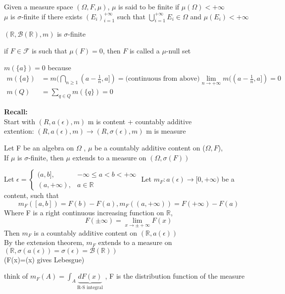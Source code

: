  \begin{definition}{}
 Given a measure space $ (\Omega,F,\mu) $,  $ \mu $ is said to be finite if $ \mu(\Omega)<+\infty $ \\
 $ \mu $ is $ \sigma $-finite if there exists $ {(E_i)}_{i=1}^{+\infty} $ such that $ \bigcup_{i=1}^{+\infty}E_i\in \Omega$ and $ \mu(E_i)<+\infty $
 \end{definition}
 \begin{example}[]{}
  $(\mathbb{R},\mathcal{B} (\mathbb{R}),m)$ is $ \sigma $-finite
 \end{example}
 \begin{definition}[]{}
 if $ F\in \mathcal{F} $ is such that $ \mu(F)=0 $, then $ F $ is called a $ \mu $-null set 
 \end{definition}
 \begin{example}[]{}
  $ m(\{a\})=0 $ because \begin{align*}{}{}
  m(\{a\})&=m(\bigcap_{n\geq1}(a-\frac{1}{n},a])=\text{(continuous from above)}\lim_{n\rightarrow+\infty}m((a-\frac{1}{n},a])=0\\
  m(Q)&=\sum_{q\in Q}m(\{q\})=0
  \end{align*} 
 \end{example}
 \textbf{Recall:}
 \\Start with $ (R,a(\epsilon),m) $ m is content + countably additive
 \\extention: $ (R,a(\epsilon),m) \rightarrow (R,\sigma(\epsilon),m) $ m is measure
 \begin{theorem}{}
 Let F be an algebra on $ \Omega $ , $ \mu $ be a countably additive content on ($ \Omega,F $), \\
 If $ \mu $ is $ \sigma $-finite, then $\mu$ extends to a measure on $ (\Omega,\sigma(F)) $
 \end{theorem}
 \begin{example}[]{}
  Let $\epsilon=\begin{cases}
    (a,b], & -\infty \leq a < b < +\infty \\
    (a,+\infty),&a\in \mathbb{R}
  \end{cases}$
Let $ m_F:a(\epsilon)\rightarrow[0,+\infty) $ be a content, such that $$ m_F([a,b])=F(b)-F(a) , m_F((a,+\infty))=F(+\infty)-F(a) $$
Where F is a right continuous increasing function on $ \mathbb{R} $, $$ F(\pm \infty)=\lim_{x\rightarrow \pm +\infty}F(x) $$
Then $ m_F $ is a countably additive content on $ (\mathbb{R},a(\epsilon)) $
\\By the extension theorem, $ m_F $ extends to a measure on $ (\mathbb{R},\sigma(a(\epsilon))=\sigma(\epsilon)=\mathcal{B} (\mathbb{R})) $ \\
(F(x)=(x) gives Lebesgue)
 \end{example}
 \begin{definition}{}
 think of $ m_F(A)=\int_{A}\underbrace{dF(x)}_{\text{R-S integral}} $ , F is the distribution function of the measure
 \end{definition}
